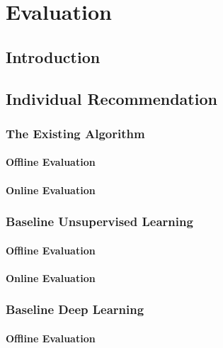 
\chapter{Evaluation}\label{chapter:evaluation}

\section{Introduction}

\section{Individual Recommendation}

\subsection{The Existing Algorithm}

\subsubsection{Offline Evaluation}

\subsubsection{Online Evaluation}

\subsection{Baseline Unsupervised Learning}

\subsubsection{Offline Evaluation}

\subsubsection{Online Evaluation}

\subsection{Baseline Deep Learning}

\subsubsection{Offline Evaluation}

